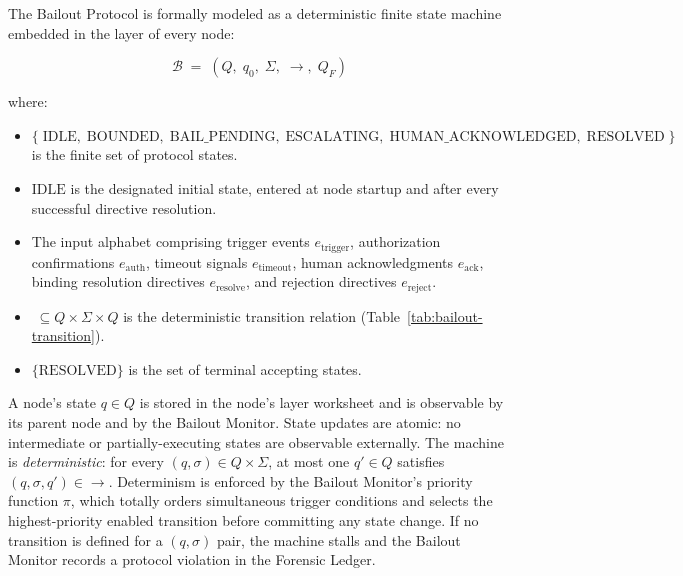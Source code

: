 The Bailout Protocol is formally modeled as a deterministic finite state machine embedded in the \fact{} layer of every \bxthree{} node:

\[
\mathcal{B} \;=\; (Q,\; q_0,\; \Sigma,\; \rightarrow,\; Q_F)
\]

where:

\begin{itemize}\itemsep=0pt
\item[$Q$] $\{\; \text{IDLE},\; \text{BOUNDED},\; \text{BAIL\_PENDING},\; \text{ESCALATING},\; \text{HUMAN\_ACKNOWLEDGED},\; \text{RESOLVED}\; \}$ is the finite set of protocol states.
\item[$q_0$] $\text{IDLE}$ is the designated initial state, entered at node startup and after every successful directive resolution.
\item[$\Sigma$] The input alphabet comprising trigger events $e_{\text{trigger}}$, authorization confirmations $e_{\text{auth}}$, timeout signals $e_{\text{timeout}}$, human acknowledgments $e_{\text{ack}}$, binding resolution directives $e_{\text{resolve}}$, and rejection directives $e_{\text{reject}}$.
\item[$\rightarrow$] $\; \subseteq Q \times \Sigma \times Q$ is the deterministic transition relation (Table~\ref{tab:bailout-transition}).
\item[$Q_F$] $\{\text{RESOLVED}\}$ is the set of terminal accepting states.
\end{itemize}

A node's state $q \in Q$ is stored in the node's \fact{} layer worksheet and is observable by its parent node and by the Bailout Monitor. State updates are atomic: no intermediate or partially-executing states are observable externally. The machine is \emph{deterministic}: for every $(q, \sigma) \in Q \times \Sigma$, at most one $q' \in Q$ satisfies $(q, \sigma, q') \in \rightarrow$. Determinism is enforced by the Bailout Monitor's priority function $\pi$, which totally orders simultaneous trigger conditions and selects the highest-priority enabled transition before committing any state change. If no transition is defined for a $(q, \sigma)$ pair, the machine stalls and the Bailout Monitor records a protocol violation in the Forensic Ledger.

